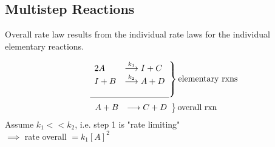 \subsection{Multistep Reactions}
    Overall rate law results from the individual rate laws for the individual elementary reactions.
    
    $$
    \left.
        \begin{array}{ll}
            2 A &\overset{k_1}{\longrightarrow} I + C \\
            I + B &\overset{k_2}{\longrightarrow} A + D \\
            \\
            \hline
        \end{array}
    \right\} \parbox[t]{2cm}{\text{elementary rxns}}
    $$
    $$
    \left.
        \begin{array}{ll}
            A + B &\longrightarrow C + D
        \end{array}
    \right\} \parbox[t]{2cm}{overall rxn}
    \vspace*{0.5em}
    $$
    Assume $k_1 << k_2$, i.e. step 1 is "rate limiting"\\
    $\implies$ rate overall $= k_1[A]^2$
